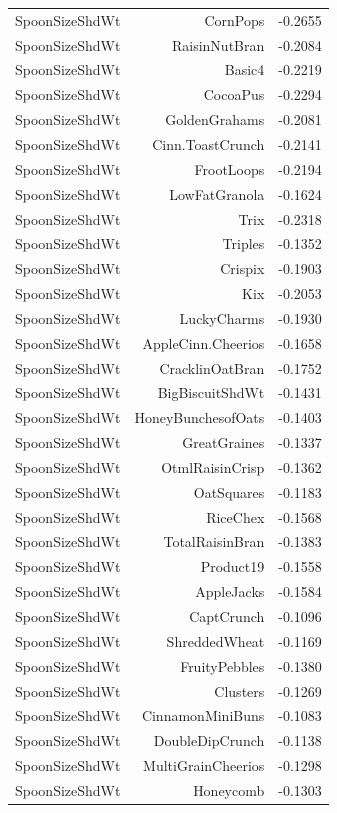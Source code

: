 \begin{longtable}{@{}lrr@{}}
SpoonSizeShdWt & CornPops & -0.2655 \\
SpoonSizeShdWt & RaisinNutBran & -0.2084 \\
SpoonSizeShdWt & Basic4 & -0.2219 \\
SpoonSizeShdWt & CocoaPus & -0.2294 \\
SpoonSizeShdWt & GoldenGrahams & -0.2081 \\
SpoonSizeShdWt & Cinn.ToastCrunch & -0.2141 \\
SpoonSizeShdWt & FrootLoops & -0.2194 \\
SpoonSizeShdWt & LowFatGranola & -0.1624 \\
SpoonSizeShdWt & Trix & -0.2318 \\
SpoonSizeShdWt & Triples & -0.1352 \\
SpoonSizeShdWt & Crispix & -0.1903 \\
SpoonSizeShdWt & Kix & -0.2053 \\
SpoonSizeShdWt & LuckyCharms & -0.1930 \\
SpoonSizeShdWt & AppleCinn.Cheerios & -0.1658 \\
SpoonSizeShdWt & CracklinOatBran & -0.1752 \\
SpoonSizeShdWt & BigBiscuitShdWt & -0.1431 \\
SpoonSizeShdWt & HoneyBunchesofOats & -0.1403 \\
SpoonSizeShdWt & GreatGraines & -0.1337 \\
SpoonSizeShdWt & OtmlRaisinCrisp & -0.1362 \\
SpoonSizeShdWt & OatSquares & -0.1183 \\
SpoonSizeShdWt & RiceChex & -0.1568 \\
SpoonSizeShdWt & TotalRaisinBran & -0.1383 \\
SpoonSizeShdWt & Product19 & -0.1558 \\
SpoonSizeShdWt & AppleJacks & -0.1584 \\
SpoonSizeShdWt & CaptCrunch & -0.1096 \\
SpoonSizeShdWt & ShreddedWheat & -0.1169 \\
SpoonSizeShdWt & FruityPebbles & -0.1380 \\
SpoonSizeShdWt & Clusters & -0.1269 \\
SpoonSizeShdWt & CinnamonMiniBuns & -0.1083 \\
SpoonSizeShdWt & DoubleDipCrunch & -0.1138 \\
SpoonSizeShdWt & MultiGrainCheerios & -0.1298 \\
SpoonSizeShdWt & Honeycomb & -0.1303 \\

\end{longtable}
